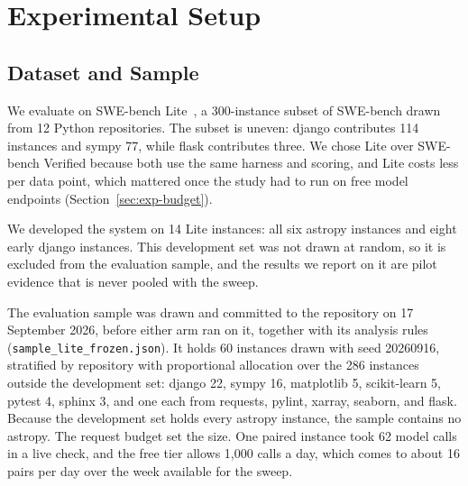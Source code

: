 \section{Experimental Setup}
\label{sec:setup}

\subsection{Dataset and Sample}
\label{sec:exp-dataset}

We evaluate on SWE-bench Lite~\cite{Jimenez2023SWEbench}, a 300-instance
subset of SWE-bench drawn from 12 Python repositories. The subset is uneven:
django contributes 114 instances and sympy 77, while flask contributes three.
We chose Lite over SWE-bench Verified because both use the same harness and
scoring, and Lite costs less per data point, which mattered once the study had
to run on free model endpoints (Section~\ref{sec:exp-budget}).

We developed the system on 14 Lite instances: all six astropy instances and
eight early django instances. This development set was not drawn at random, so
it is excluded from the evaluation sample, and the results we report on it are
pilot evidence that is never pooled with the sweep.

The evaluation sample was drawn and committed to the repository on 17
September 2026, before either arm ran on it, together with its analysis rules
(\texttt{sample\_lite\_frozen.json}). It holds 60 instances drawn with seed
20260916, stratified by repository with proportional allocation over the 286
instances outside the development set: django 22, sympy 16, matplotlib 5,
scikit-learn 5, pytest 4, sphinx 3, and one each from requests, pylint, xarray,
seaborn, and flask. Because the development set holds every astropy instance,
the sample contains no astropy. The request budget set the size. One paired
instance took 62 model calls in a live check, and the free tier allows 1,000
calls a day, which comes to about 16 pairs per day over the week available for
the sweep.

